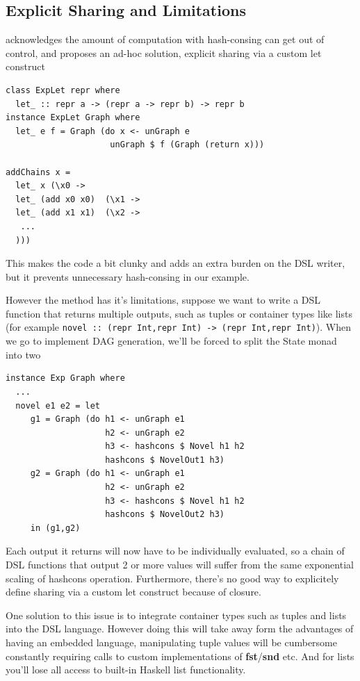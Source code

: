 \documentclass[runningheads]{llncs}
\begin{document}
\subsection{Explicit Sharing and Limitations} \label{limitexplicit}

\cite{kiselyov:sharing} acknowledges the amount of computation with hash-consing
can get out of control, and proposes an ad-hoc solution, explicit sharing via a
custom let construct
\begin{verbatim}
class ExpLet repr where
  let_ :: repr a -> (repr a -> repr b) -> repr b
instance ExpLet Graph where
  let_ e f = Graph (do x <- unGraph e
                     unGraph $ f (Graph (return x)))

addChains x =
  let_ x (\x0 ->
  let_ (add x0 x0)  (\x1 ->
  let_ (add x1 x1)  (\x2 ->
   ...
  )))
\end{verbatim}
This makes the code a bit clunky and adds an extra burden on the DSL writer, but
it prevents unnecessary hash-consing in our example.

However the method has it's limitations, suppose we want to write a DSL function
that returns multiple
outputs, such as tuples or container types like lists (for example
\texttt{novel :: (repr Int,repr Int) -> (repr Int,repr Int)}). When
we go to implement DAG generation, we'll be forced to split the State monad into
two
\begin{verbatim}
instance Exp Graph where
  ...
  novel e1 e2 = let
     g1 = Graph (do h1 <- unGraph e1
                    h2 <- unGraph e2
                    h3 <- hashcons $ Novel h1 h2
                    hashcons $ NovelOut1 h3)
     g2 = Graph (do h1 <- unGraph e1
                    h2 <- unGraph e2
                    h3 <- hashcons $ Novel h1 h2
                    hashcons $ NovelOut2 h3)
     in (g1,g2)
\end{verbatim}
Each output it returns will now have to be individually evaluated, so a
chain of DSL functions that output 2 or more values will suffer from the same
exponential scaling of hashcons operation. Furthermore, there's no good way to
explicitely define sharing via a custom let construct because of closure.

One solution to this issue is to integrate container types such as tuples and
lists into the DSL language. However doing this will take away form the
advantages of having an embedded language, manipulating tuple values will be
cumbersome constantly requiring calls to custom implementations of {\bf
  fst}/{\bf snd} etc. And for lists you'll lose all access to built-in Haskell
list functionality.
\end{document}
